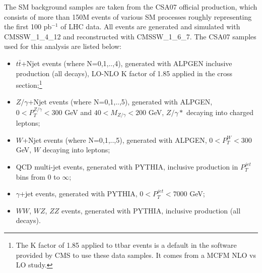 %


The SM background samples are taken from the CSA07 official production,
which consists of more than 150M events of various SM processes roughly representing the first 100 pb$^{-1}$ of LHC data.
All events are generated and simulated with CMSSW\_1\_4\_12 and reconstructed with CMSSW\_1\_6\_7. 
The CSA07 samples used for this analysis are listed below:
\begin{itemize}
%
\item $t\bar{t}$+Njet events (where N=0,1,..,4), generated with ALPGEN \cite{Mangano:2002ea} inclusive production (all decays), 
LO-NLO K factor of 1.85 applied 
in the cross section;\footnote{The K factor of 1.85 applied to ttbar events is a default in the software provided by CMS to 
use these data samples.  It comes from a MCFM NLO vs LO study.}
%
\item $Z/\gamma$+Njet events (where N=0,1,..,5), generated with ALPGEN, $ 0 < P_{T}^{Z/\gamma} < 300 $ GeV and $40<M_{Z/\gamma}<200$ GeV, 
$Z/\gamma*$ decaying into charged leptons;  
%
\item $W$+Njet events (where N=0,1,..,5), generated with ALPGEN, $ 0 < P_{T}^{W} < 300 $ GeV, $W$ decaying into leptons;  
%
\item QCD multi-jet events, generated with PYTHIA, inclusive production in $P_{T}^{jet}$ bins from 0 to $\infty$;  
%
\item $\gamma$+jet events, generated with PYTHIA, $ 0 < P_{T}^{jet} < 7000 $ GeV;  
%
\item $WW$, $WZ$, $ZZ$ events, generated with PYTHIA, inclusive production (all decays).
\end{itemize} 

